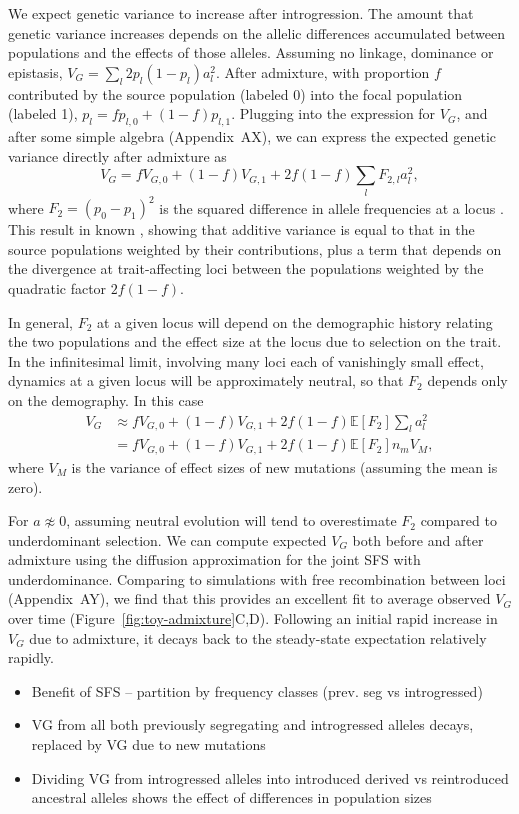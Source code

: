 \documentclass{article}
\begin{document}
We expect genetic variance to increase after introgression. The amount that
genetic variance increases depends on the allelic differences accumulated
between populations and the effects of those alleles. Assuming no linkage,
dominance or epistasis, \(V_G=\sum_l 2p_l(1-p_l)a_l^2\). After admixture, with
proportion $f$ contributed by the source population (labeled 0) into the focal
population (labeled 1), \(p_l = fp_{l,0} + (1-f)p_{l,1}\). Plugging into the
expression for $V_G$, and after some simple algebra (Appendix~AX), we can
express the expected genetic variance directly after admixture as \[V_G =
fV_{G,0} + (1-f) V_{G,1} + 2f(1-f)\sum_l F_{2,l} a_l^2,\] where $F_2 = (p_0 -
p_1)^2$ is the squared difference in allele frequencies at a locus
\citep[e.g.,][]{peter2016admixture}. This result in known \citep[e.g.,][]{},
showing that additive variance is equal to that in the source populations
weighted by their contributions, plus a term that depends on the divergence at
trait-affecting loci between the populations weighted by the quadratic factor
$2f(1-f)$.

In general, $F_2$ at a given locus will depend on the demographic history
relating the two populations and the effect size at the locus due to selection
on the trait. In the infinitesimal limit, involving many loci each of
vanishingly small effect, dynamics at a given locus will be approximately
neutral, so that $F_2$ depends only on the demography. In this case
\begin{align*}
    V_G & \approx f V_{G,0} + (1-f) V_{G,1} + 2f(1-f)\mathbb{E}[F_2] \sum_l a_l^2 \\
    & = f V_{G,0} + (1-f) V_{G,1} + 2f(1-f)\mathbb{E}[F_2] n_m V_M,
\end{align*}
where $V_M$ is the variance of effect sizes of new mutations (assuming the mean
is zero). 

For $a \not\approx 0$, assuming neutral evolution will tend to overestimate
$F_2$ compared to underdominant selection. We can compute expected $V_G$ both
before and after admixture using the diffusion approximation for the joint SFS
with underdominance. Comparing to simulations with free recombination between
loci (Appendix~AY), we find that this provides an excellent fit to average
observed $V_G$ over time (Figure~\ref{fig:toy-admixture}C,D). Following an
initial rapid increase in $V_G$ due to admixture, it decays back to the
steady-state expectation relatively rapidly.

\begin{itemize}
    \item Benefit of SFS -- partition by frequency classes (prev. seg vs introgressed)
    \item VG from all both previously segregating and introgressed alleles decays,
        replaced by VG due to new mutations
    \item Dividing VG from introgressed alleles into introduced derived vs reintroduced
        ancestral alleles shows the effect of differences in population sizes
\end{itemize}
\end{document}
